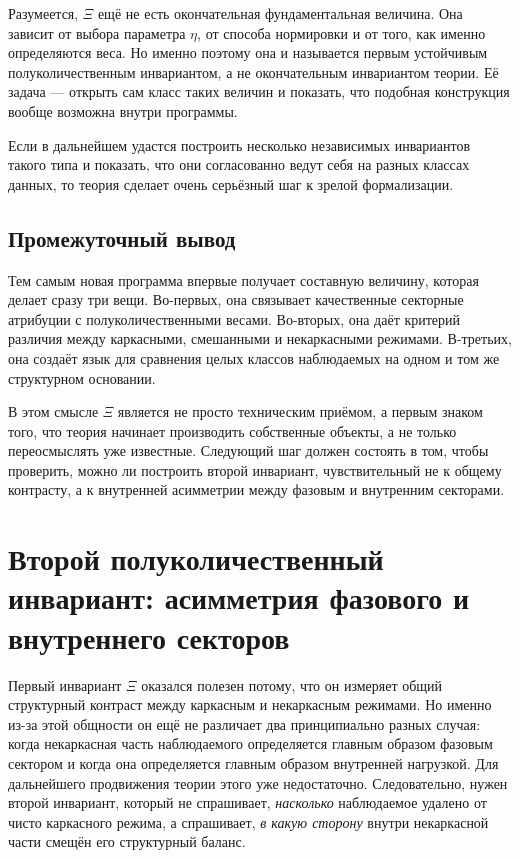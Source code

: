 \documentclass[12pt,a4paper]{article}
\begin{document}
Разумеется, \(\Xi\) ещё не есть окончательная фундаментальная величина. Она зависит от выбора параметра \(\eta\), от способа нормировки и от того, как именно определяются веса. Но именно поэтому она и называется первым устойчивым полуколичественным инвариантом, а не окончательным инвариантом теории. Её задача --- открыть сам класс таких величин и показать, что подобная конструкция вообще возможна внутри программы.

Если в дальнейшем удастся построить несколько независимых инвариантов такого типа и показать, что они согласованно ведут себя на разных классах данных, то теория сделает очень серьёзный шаг к зрелой формализации.

\subsection{Промежуточный вывод}

Тем самым новая программа впервые получает составную величину, которая делает сразу три вещи. Во-первых, она связывает качественные секторные атрибуции с полуколичественными весами. Во-вторых, она даёт критерий различия между каркасными, смешанными и некаркасными режимами. В-третьих, она создаёт язык для сравнения целых классов наблюдаемых на одном и том же структурном основании.

В этом смысле \(\Xi\) является не просто техническим приёмом, а первым знаком того, что теория начинает производить собственные объекты, а не только переосмыслять уже известные. Следующий шаг должен состоять в том, чтобы проверить, можно ли построить второй инвариант, чувствительный не к общему контрасту, а к внутренней асимметрии между фазовым и внутренним секторами.


\section{Второй полуколичественный инвариант: асимметрия фазового и внутреннего секторов}

Первый инвариант \(\Xi\) оказался полезен потому, что он измеряет общий структурный контраст между каркасным и некаркасным режимами. Но именно из-за этой общности он ещё не различает два принципиально разных случая: когда некаркасная часть наблюдаемого определяется главным образом фазовым сектором и когда она определяется главным образом внутренней нагрузкой. Для дальнейшего продвижения теории этого уже недостаточно. Следовательно, нужен второй инвариант, который не спрашивает, \textit{насколько} наблюдаемое удалено от чисто каркасного режима, а спрашивает, \textit{в какую сторону} внутри некаркасной части смещён его структурный баланс.
\end{document}

